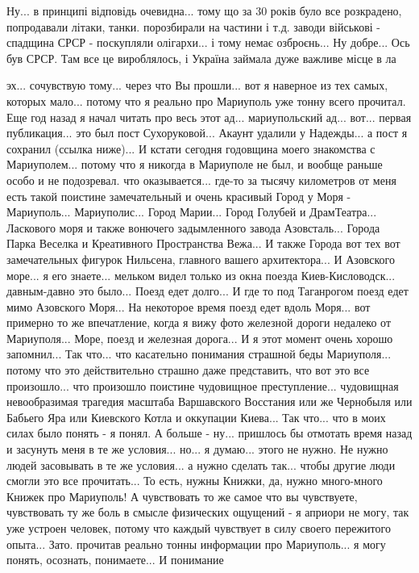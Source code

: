 Ну... в принципі відповідь очевидна... тому що за 30 років було все розкрадено,
попродавали літаки, танки. порозбирали на частини і т.д. заводи військові -
спадщина СРСР - поскупляли олігархи... і тому немає озброєнь... Ну добре... Ось
був СРСР.  Там все це вироблялось, і Україна займала дуже важливе місце в ла


эх... сочувствую тому... через что Вы прошли... вот я наверное из тех самых,
которых мало... потому что я реально про Мариуполь уже тонну всего прочитал.
Еще год назад я начал читать про весь этот ад... мариупольский ад... вот...
первая публикация... это был пост Сухоруковой... Акаунт удалили у Надежды... а
пост я сохранил (ссылка ниже)... И кстати сегодня годовщина моего знакомства с
Мариуполем... потому что я никогда в Мариуполе не был, и вообще раньше особо и
не подозревал. что оказывается... где-то за тысячу километров от меня есть
такой поистине замечательный и очень красивый Город у Моря - Мариуполь...
Мариуполис... Город Марии... Город Голубей и ДрамТеатра... Ласкового моря и
также вонючего задымленного завода Азовсталь... Города Парка Веселка и
Креативного Пространства Вежа... И также Города вот тех вот замечательных
фигурок Нильсена, главного вашего архитектора... И Азовского море... я его
знаете... мельком видел только из окна поезда Киев-Кисловодск... давным-давно
это было... Поезд едет долго... И где то под Таганрогом поезд едет мимо
Азовского Моря... На некоторое время поезд едет вдоль Моря... вот примерно то
же впечатление, когда я вижу фото железной дороги недалеко от Мариуполя...
Море, поезд и железная дорога... И я этот момент очень хорошо запомнил... Так
что... что касательно понимания страшной беды Мариуполя... потому что это
действительно страшно даже представить, что вот это все произошло... что
произошло поистине чудовищное преступление... чудовищная невообразимая трагедия
масштаба Варшавского Восстания или же Чернобыля или Бабьего Яра или Киевского
Котла и оккупации Киева... Так что... что в моих силах было понять - я понял. А
больше - ну... пришлось бы отмотать время назад и засунуть меня в те же
условия... но... я думаю... этого не нужно. Не нужно людей засовывать в те же
условия... а нужно сделать так... чтобы другие люди смогли это все прочитать...
То есть, нужны Книжки, да, нужно много-много Книжек про Мариуполь! А
чувствовать то же самое что вы чувствуете, чувствовать ту же боль в смысле
физических ощущений - я априори не могу, так уже устроен человек, потому что
каждый чувствует в силу своего пережитого опыта... Зато. прочитав реально тонны
информации про Мариуполь... я могу понять, осознать, понимаете... И понимание
